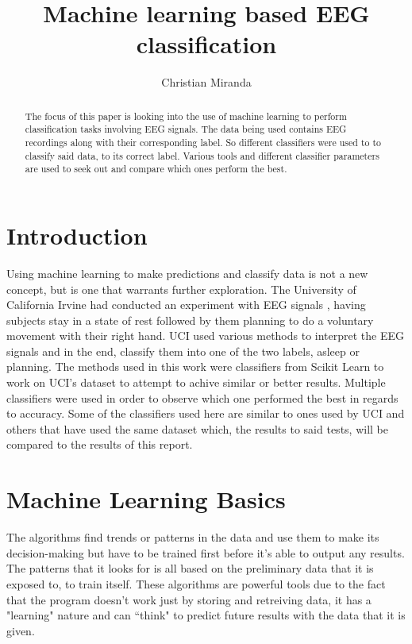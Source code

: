 \documentclass[conference,compsoc]{IEEEtran}
\begin{document}
\author{Christian Miranda}
\title{Machine learning based EEG classification}
\maketitle

\begin{abstract}
The focus of this paper is looking into the use of machine learning to perform classification tasks involving EEG signals.
The data being used contains EEG recordings along with their corresponding label. So different classifiers were used to 
to classify said data, to its correct label. Various tools and different classifier parameters are used to seek 
out and compare which ones perform the best. 
\end{abstract}

\section{Introduction}
Using machine learning to make predictions and classify data is not a new concept, but is one that warrants further exploration. 
The University of California Irvine had conducted an experiment with EEG signals \cite{classsvm}, having subjects stay in a state of rest followed by them planning to do a voluntary movement with their right hand. 
UCI used various methods to interpret the EEG signals and in the end, classify them into one of the two labels, asleep or planning. The methods used in this work were classifiers from 
Scikit Learn to work on UCI's dataset to attempt to achive similar or better results. Multiple classifiers were used in order to observe which one performed the best in regards 
to accuracy. Some of the classifiers used here are similar to ones used by UCI and others that have used the same dataset \cite{fuzzy} which, the results to said tests, will be compared to the results of this report.

\section{Machine Learning Basics}
The algorithms find trends or patterns in the data and use them to make its decision-making but have to be trained first before it's able to output any results.  The patterns that it looks for is all based on the preliminary data that it is exposed to, to train itself. These algorithms are powerful tools due to the fact that the program doesn't work just by storing and retreiving data, it has a "learning" nature and can ``think" to predict future results with the data that it is given.
\end{document}
